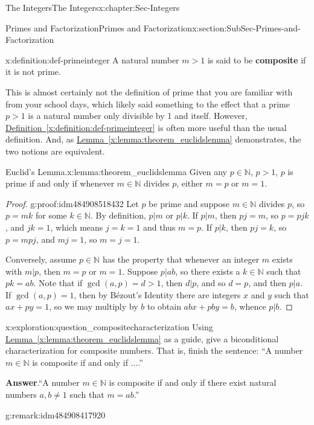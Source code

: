 \documentclass[oneside,10pt,]{book}
\newcommand{\blocktitlefont}{\relax}
\newcommand{\xreffont}{\relax}
\newcommand{\terminology}[1]{\textbf{#1}}
\numberwithin{equation}{section}
\def\N{{\mathbb N}}
\begin{document}
\begin{chapterptx}{The Integers}{}{The Integers}{}{}{x:chapter:Sec-Integers}
\begin{sectionptx}{Primes and Factorization}{}{Primes and Factorization}{}{}{x:section:SubSec-Primes-and-Factorization}
\begin{definition}{}{x:definition:def-primeinteger}
A natural number \(m > 1\) is said to be \terminology{composite} if it is not prime.%
\end{definition}
This is almost certainly not the definition of prime that you are familiar with from your school days, which likely said something to the effect that a prime \(p > 1\) is a natural number only divisible by 1 and itself. However, \hyperref[x:definition:def-primeinteger]{Definition~{\xreffont\ref{x:definition:def-primeinteger}}} is often more useful than the usual definition. And, as \hyperref[x:lemma:theorem_euclidslemma]{Lemma~{\xreffont\ref{x:lemma:theorem_euclidslemma}}} demonstrates, the two notions are equivalent.%
\begin{lemma}{Euclid's Lemma.}{}{x:lemma:theorem_euclidslemma}%
Given any \(p\in \N\), \(p > 1\), \(p\) is prime if and only if whenever \(m\in \N\) divides \(p\), either \(m = p\) or \(m = 1\).%
\end{lemma}
\begin{proof}{}{g:proof:idm484908518432}
Let \(p\) be prime and suppose \(m\in \N\) divides \(p\), so \(p = mk\) for some \(k\in \N\). By definition, \(p|m\) or \(p|k\). If \(p|m\), then \(pj = m\), so \(p = pjk\), and \(jk=1\), which means \(j=k=1\) and thus \(m=p\). If \(p|k\), then \(pj=k\), so \(p = mpj\), and \(mj=1\), so \(m = j = 1\).%
\par
Conversely, assume \(p\in \N\) has the property that whenever an integer \(m\) exists with \(m|p\), then \(m= p\) or \(m =1\). Suppose \(p|ab\), so there exists a \(k\in\N\) such that \(pk = ab\). Note that if \(\gcd(a,p) = d > 1\), then \(d|p\), and so \(d = p\), and then \(p|a\). If \(\gcd(a,p) = 1\), then by Bézout's Identity there are integers \(x\) and \(y\) such that \(ax + py = 1\), so we may multiply by \(b\) to obtain \(abx + pby = b\), whence \(p|b\).%
\end{proof}
\begin{exploration}{}{x:exploration:question_compositecharacterization}%
Using \hyperref[x:lemma:theorem_euclidslemma]{Lemma~{\xreffont\ref{x:lemma:theorem_euclidslemma}}} as a guide, give a biconditional characterization for composite numbers. That is, finish the sentence: ``A number \(m\in\N\) is composite if and only if ....''%
\par\smallskip%
\noindent\textbf{\blocktitlefont Answer}.\hypertarget{g:answer:idm484908424320}{}\quad{}``A number \(m\in\N\) is composite if and only if there exist natural numbers \(a,b\ne 1\) such that \(m = ab\).''%
\end{exploration}
\begin{remark}{}{g:remark:idm484908417920}%

\end{remark}
\end{sectionptx}
\end{chapterptx}
\end{document}

